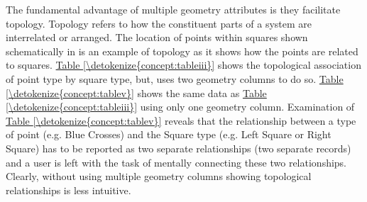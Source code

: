 \documentclass[letterpaper,10pt,english]{sphinxmanual}
\begin{document}
The fundamental advantage of multiple geometry attributes is they facilitate topology. Topology refers to how the
constituent parts of a system are interrelated or arranged.  The location of points within squares shown schematically
in  is an example of topology as it shows how the points are related to squares.  \hyperref[\detokenize{concept:tableiii}]{Table \ref{\detokenize{concept:tableiii}}} shows the topological
association of point type by square type, but, uses two geometry columns to do so.  \hyperref[\detokenize{concept:tablev}]{Table \ref{\detokenize{concept:tablev}}} shows the same data as
\hyperref[\detokenize{concept:tableiii}]{Table \ref{\detokenize{concept:tableiii}}} using only one geometry column.  Examination of \hyperref[\detokenize{concept:tablev}]{Table \ref{\detokenize{concept:tablev}}} reveals that the relationship between a type of point (e.g. Blue Crosses) and the Square type (e.g. Left Square or Right Square) has to be reported as two separate
relationships (two separate records) and a user is left with the task of mentally connecting these two relationships.  Clearly, without using multiple geometry columns showing topological relationships is less intuitive.
\end{document}
